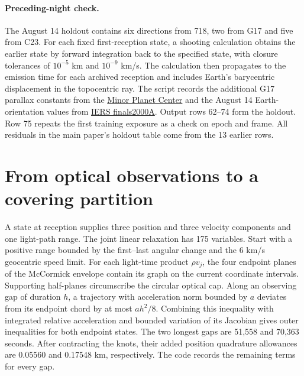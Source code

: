 \documentclass[10pt,letterpaper]{article}
\begin{document}
\paragraph{Preceding-night check.}
The August 14 holdout contains six directions from 718, two from G17 and five from C23. For each fixed first-reception state, a shooting calculation obtains the earlier state by forward integration back to the specified state, with closure tolerances of $10^{-5}$ km and $10^{-9}$ km/s. The calculation then propagates to the emission time for each archived reception and includes Earth's barycentric displacement in the topocentric ray. The script records the additional G17 parallax constants from the \href{https://minorplanetcenter.net/iau/lists/ObsCodes.html}{Minor Planet Center} and the August 14 Earth-orientation values from \href{https://datacenter.iers.org/data/9/finals2000A.all}{IERS finals2000A}. Output rows 62--74 form the holdout. Row 75 repeats the first training exposure as a check on epoch and frame. All residuals in the main paper's holdout table come from the 13 earlier rows.

\section{From optical observations to a covering partition}
A state at reception supplies three position and three velocity components and one light-path range. The joint linear relaxation has 175 variables. Start with a positive range bounded by the first--last angular change and the $6$ km/s geocentric speed limit. For each light-time product $\rho v_j$, the four endpoint planes of the McCormick envelope contain its graph on the current coordinate intervals. Supporting half-planes circumscribe the circular optical cap. Along an observing gap of duration $h$, a trajectory with acceleration norm bounded by $a$ deviates from its endpoint chord by at most $ah^2/8$. Combining this inequality with integrated relative acceleration and bounded variation of its Jacobian gives outer inequalities for both endpoint states. The two longest gaps are 51,558 and 70,363 seconds. After contracting the knots, their added position quadrature allowances are 0.05560 and 0.17548 km, respectively. The code records the remaining terms for every gap.
\end{document}
